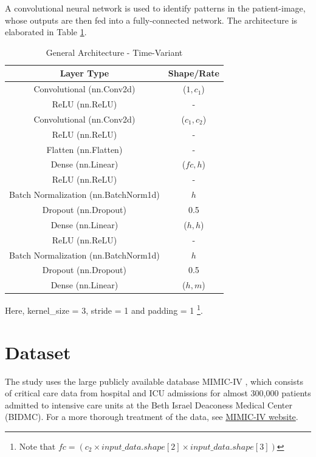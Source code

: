 \documentclass[%
 twocolumn,
 reprint,
 amsmath,amssymb,
 aps,nofootinbib
]{revtex4-2}
\begin{document}
A convolutional neural network is used to identify patterns in the patient-image, whose outputs are then fed into a fully-connected network. The architecture is elaborated in Table \ref{tab:arch2}.
\begin{table}[H]
  \centering
  \begin{tabular}{|c|c|}
    \hline
    \textbf{Layer Type} & \textbf{Shape/Rate} \\
    \hline
    Convolutional (nn.Conv2d) & ($1,c_1$) \\
    ReLU (nn.ReLU) & - \\
    Convolutional (nn.Conv2d) & ($c_1,c_2$) \\
    ReLU (nn.ReLU) & - \\
    Flatten (nn.Flatten) & - \\
    Dense (nn.Linear) & ($fc, h$) \\
    ReLU (nn.ReLU) & - \\
    Batch Normalization (nn.BatchNorm1d) & $h$ \\
    Dropout (nn.Dropout) & 0.5 \\ 
    Dense (nn.Linear) & ($h, h$) \\
    ReLU (nn.ReLU) & - \\
    Batch Normalization (nn.BatchNorm1d) & $h$ \\
    Dropout (nn.Dropout) & 0.5 \\
    Dense (nn.Linear) & ($h, m$) \\
    \hline
  \end{tabular}
  \caption[General Architecture Time-Variant]{General Architecture - Time-Variant}
  \label{tab:arch2}
\end{table}
Here, kernel\_size = 3, stride = 1 and padding = 1 \footnote{Note that $fc = (c_2 \times input\_data.shape[2] \times input\_data.shape[3])$}.

\section{\label{data}Dataset}
The study uses the large publicly available database MIMIC-IV \cite{mimic_iv}, which consists of critical care data from hospital and ICU admissions for almost 300,000 patients admitted to intensive care units at the Beth Israel Deaconess Medical Center (BIDMC). For a more thorough treatment of the data, see \href{https://physionet.org/content/mimiciv/2.2/}{MIMIC-IV website}.
\end{document}

